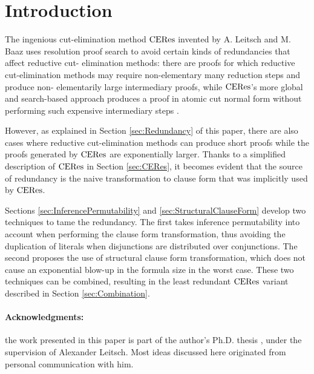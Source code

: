 \section{Introduction}

The ingenious cut-elimination method $\mathrm{CERes}$ invented by A. Leitsch and M.
Baaz
\cite{BaazLeitsch1999MethodsofCut-Elimination,BaazLeitsch2000Cut-eliminationandRedundancy-eliminationbyResolution,BaazLeitsch2006Towardsaclausalanalysisofcut-elimination} 
uses resolution
proof search to avoid certain kinds of redundancies that affect reductive cut-
elimination methods: there are proofs for which reductive cut-elimination
methods may require non-elementary many reduction steps and produce non-
elementarily large intermediary proofs, while $\mathrm{CERes}$'s more global and
search-based approach produces a proof in atomic cut normal form without
performing such expensive intermediary steps \cite
{BaazLeitsch2009MethodsofCut-Elimination}.

However, as explained in Section \ref{sec:Redundancy} of this paper, there are
also cases where reductive cut-elimination methods can produce short proofs
while the proofs generated by $\mathrm{CERes}$ are exponentially larger. Thanks to a
simplified description of $\mathrm{CERes}$ in Section \ref{sec:CERes}, it becomes
evident that the source of redundancy is the naive transformation to clause
form that was implicitly used by $\mathrm{CERes}$.

Sections \ref{sec:InferencePermutability} and \ref{sec:StructuralClauseForm}
develop two techniques to tame the redundancy. The first takes inference
permutability into account when performing the clause form transformation,
thus avoiding the duplication of literals when disjunctions are distributed
over conjunctions. The second proposes the use of structural clause form
transformation, which does not cause an exponential blow-up in the formula
size in the worst case. These two techniques can be combined, resulting in the
least redundant $\mathrm{CERes}$ variant described in Section \ref{sec:Combination}.

\paragraph{Acknowledgments:} the work presented in this paper is part of the
author's Ph.D. thesis
\cite{Woltzenlogel-Paleo2009A-General-Analysis-of-Cut-Elimination-by-CERes},
under the supervision of Alexander Leitsch.  Most
ideas discussed here originated from personal communication with him.
